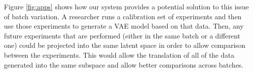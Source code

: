 Figure \ref{fig:apps} shows how our system provides a potential solution to this issue of batch variation.
A researcher runs a calibration set of experiments and then use those experiments to generate a VAE model based on that data.
Then, any future experiments that are performed (either in the same batch or a different one) could be projected into the same latent space in order to allow comparison between the experiments.
This would allow the translation of all of the data generated into the same subspace and allow better comparisons across batches.

